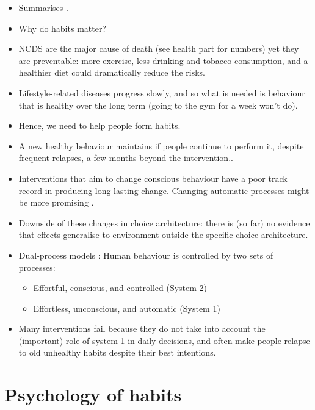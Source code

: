 \documentclass[a4paper, 11pt]{report}
\begin{document}
\begin{itemize}
	\item Summarises \citet{runger2015maintenanace}.
	\item Why do habits matter?

	\item NCDS are the major cause of death (see health part for numbers) yet they are preventable: more exercise, less drinking and tobacco consumption, and a healthier diet could dramatically reduce the risks.

	\item Lifestyle-related diseases progress slowly, and so what is needed is behaviour that is healthy over the long term (going to the gym for a week won't do).

	\item Hence, we need to help people form habits.

	\item A new healthy behaviour maintains if people continue to perform it, despite frequent relapses, a few months beyond the intervention.\citep{fjeldsoe2011systematic}.

	\item Interventions that aim to change conscious behaviour have a poor track record in producing long-lasting change. Changing automatic processes might be more promising \citep{marteau2012changing}.

	\item Downside of these changes in choice architecture: there is (so far) no evidence that effects generalise to environment outside the specific choice architecture.

	\item Dual-process models \citep{sherman2014dual}: Human behaviour is controlled by two sets of processes:
	\begin{itemize}
		\item Effortful, conscious, and controlled (System 2)
		\item Effortless, unconscious, and automatic (System 1)
	\end{itemize}

	\item Many interventions fail because they do not take into account the (important) role of system 1 in daily decisions, and often make people relapse to old unhealthy habits despite their best intentions.
\end{itemize}


\chapter{Psychology of habits}
\end{document}
